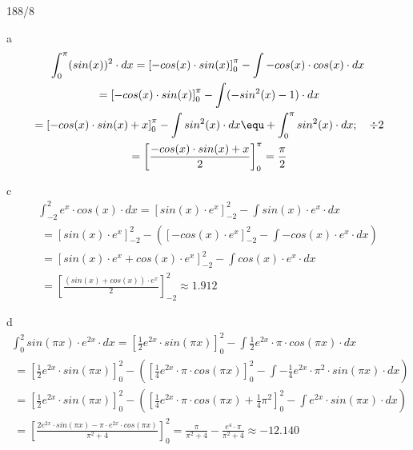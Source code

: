 \begin{exercise}{188/8}
  \item [a]
  \begin{gather*}
    \int_0^\pi (sin(x))^2 \cdot dx = \left[-cos(x) \cdot sin(x)\right]_0^\pi - \int -cos(x) \cdot cos(x) \cdot dx \\
    \;= \left[-cos(x) \cdot sin(x)\right]_0^\pi - \int (-sin^2(x) - 1) \cdot dx \\
    \;= \left[-cos(x) \cdot sin(x) + x\right]_0^\pi - \int sin^2(x) \cdot dx \equ + \int_0^\pi sin^2(x) \cdot dx; \quad \div 2 \\
    \;= \left[\frac{-cos(x) \cdot sin(x) + x}{2}\right]_0^\pi = \frac{\pi}{2}
  \end{gather*}
  \item [c]
  \begin{gather*}
    \int_{-2}^2 e^x \cdot cos(x) \cdot dx = \left[sin(x) \cdot e^x\right]_{-2}^2 - \int sin(x) \cdot e^x \cdot dx \\
    \;= \left[sin(x) \cdot e^x\right]_{-2}^2 - (\left[-cos(x) \cdot e^x\right]_{-2}^2 - \int -cos(x) \cdot e^x \cdot dx) \\
    \;= \left[sin(x) \cdot e^x + cos(x) \cdot e^x\right]_{-2}^2 - \int cos(x) \cdot e^x \cdot dx \\
    \;= \left[\frac{(sin(x) + cos(x)) \cdot e^x}{2}\right]_{-2}^2 \approx 1.912
  \end{gather*}
  \item [d]
  \begin{gather*}
    \int_0^2 sin(\pi x) \cdot e^{2x} \cdot dx = \left[\frac{1}{2}e^{2x} \cdot sin(\pi x)\right]_0^2 - \int \frac{1}{2}e^{2x} \cdot \pi \cdot cos(\pi x) \cdot dx \\
    \;= \left[\frac{1}{2}e^{2x} \cdot sin(\pi x)\right]_0^2 - (\left[\frac{1}{4}e^{2x} \cdot \pi \cdot cos(\pi x)\right]_0^2 - \int -\frac{1}{4}e^{2x} \cdot \pi^2 \cdot sin(\pi x) \cdot dx) \\
    \;= \left[\frac{1}{2}e^{2x} \cdot sin(\pi x)\right]_0^2 - (\left[\frac{1}{4}e^{2x} \cdot \pi \cdot cos(\pi x) + \frac{1}{4}\pi^2\right]_0^2 - \int e^{2x} \cdot sin(\pi x) \cdot dx) \\
    \;= \left[\frac{2e^{2x} \cdot sin(\pi x) - \pi \cdot e^{2x} \cdot cos(\pi x)}{\pi^2 + 4}\right]_0^2 = \frac{\pi}{\pi^2 + 4} - \frac{e^4 \cdot \pi}{\pi^2 + 4} \approx -12.140
  \end{gather*}
\end{exercise}
